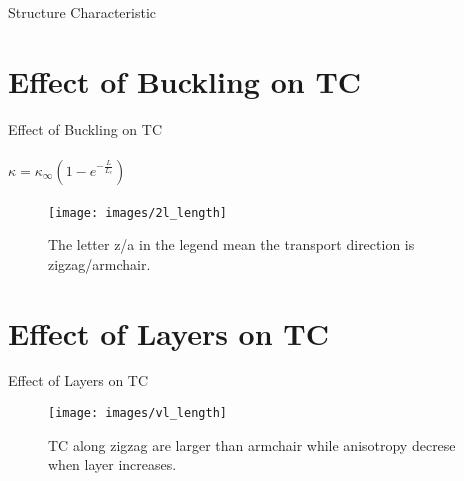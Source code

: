 \documentclass{beamer}
\begin{document}
\begin{frame}{Structure Characteristic}
\begin{table}[!b]
    \caption{
      Symmetry of the structures, binding energy $E_c(eV/Si)$ and structure features}
  \end{table}

\end{frame}
\section{Effect of Buckling on TC}
\begin{frame}{Effect of Buckling on TC}
  \framesubtitle{$\kappa = \kappa_\infty (1-e^{-\frac{L}{L_c}})$}%

  \begin{figure}[b]
    \texttt{[image: images/2l\_length]}
    \caption{\label{fig:2l_length} The letter z/a in the legend mean the transport direction is zigzag/armchair.}
  \end{figure}

\end{frame}

\section{Effect of Layers on TC}
\begin{frame}{Effect of Layers on TC}
  \begin{figure}[b]
    \texttt{[image: images/vl\_length]}
    \caption{\label{fig:vl_length} TC along zigzag are larger than armchair while anisotropy decrese when layer increases.}
  \end{figure}
\end{frame}
\end{document}
